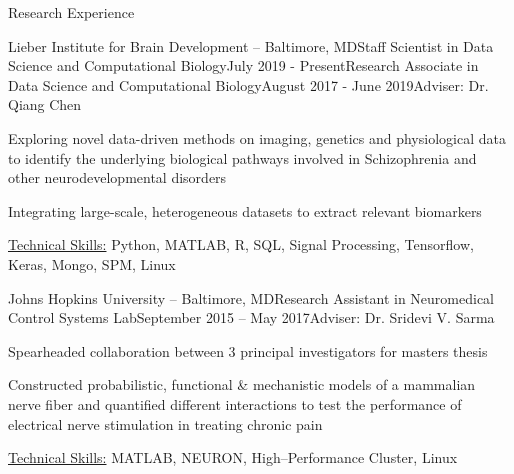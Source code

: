 \documentclass{resume}
\begin{document}
  \begin{rSection}{Research Experience}
\begin{rSubsectionPromotion}{Lieber Institute for Brain Development -- Baltimore, MD}{}{Staff Scientist in Data Science and Computational Biology}{July 2019 - Present}{Research Associate in Data Science and Computational Biology}{August 2017 - June 2019}{Adviser: Dr. Qiang Chen}
\item Exploring novel data-driven methods on imaging, genetics and physiological data to identify the underlying biological pathways involved in Schizophrenia and other neurodevelopmental disorders
\item Integrating large-scale, heterogeneous datasets to extract relevant biomarkers
\item \uline{Technical Skills:} Python, MATLAB, R, SQL, Signal Processing, Tensorflow, Keras, Mongo, SPM, Linux
    \end{rSubsectionPromotion}

    \begin{rSubsection}{Johns Hopkins University -- Baltimore, MD}{}{Research Assistant in Neuromedical Control Systems Lab}{September 2015 -- May 2017}{Adviser: Dr. Sridevi V. Sarma}
\item Spearheaded collaboration between 3 principal investigators for masters thesis
\item Constructed probabilistic, functional \& mechanistic models of a mammalian nerve fiber and quantified different interactions to test the performance of electrical nerve stimulation in treating chronic pain
\item \uline{Technical Skills:} MATLAB, NEURON, High--Performance Cluster, Linux
    \end{rSubsection}
  

\end{rSection}
\end{document}
